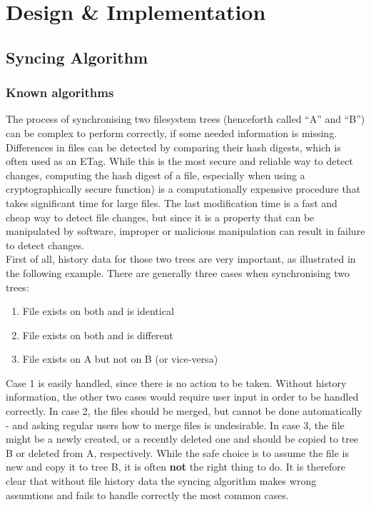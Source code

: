 
\chapter{Design \& Implementation}
\label{cha:design_implementation}

\section{Syncing Algorithm}
  \subsection{Known algorithms}
    The process of synchronising two filesystem trees (henceforth called ``A'' and ``B'') can be complex to perform correctly, if some needed information is missing. Differences in files can be detected by comparing their hash digests, which is often used as an ETag. While this is the most secure and reliable way to detect changes, computing the hash digest of a file, especially when using a cryptographically secure function) is a computationally expensive procedure that takes significant time for large files. The last modification time is a fast and cheap way to detect file changes, but since it is a property that can be manipulated by software, improper or malicious manipulation can result in failure to detect changes.\\

     First of all, history data for those two trees are very important, as illustrated in the following example. There are generally three cases when synchronising two trees:
    \begin{enumerate}
      \item File exists on both and is identical
      \item File exists on both and is different
      \item File exists on A but not on B (or vice-versa)
    \end{enumerate}
    Case 1 is easily handled, since there is no action to be taken. Without history information, the other two cases would require user input in order to be handled correctly. In case 2, the files should be merged, but cannot be done automatically - and asking regular users how to merge files is undesirable. In case 3, the file might be a newly created, or a recently deleted one and should be copied to tree B or deleted from A, respectively. While the safe choice is to assume the file is new and copy it to tree B, it is often \textbf{not} the right thing to do. It is therefore clear that without file history data the syncing algorithm makes wrong assumtions and fails to handle correctly the most common cases.\\

